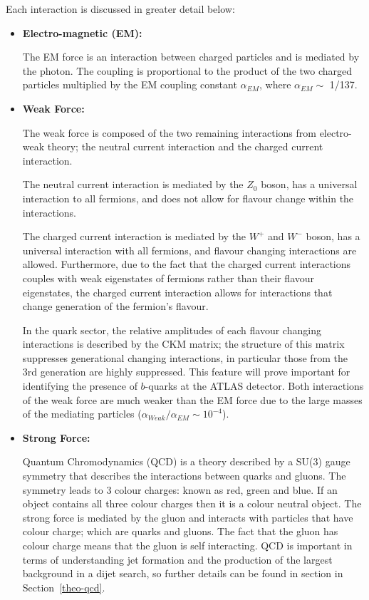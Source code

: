 \noindent
Each interaction is discussed in greater detail below:
\begin{itemize}[leftmargin=*]
\item\textbf{Electro-magnetic (EM):}

  The EM force is an interaction between charged particles and is mediated by the photon.
  The coupling is proportional to the product of the two charged particles
  multiplied by the EM coupling constant $\alpha_{EM}$, where $\alpha_{EM} \sim$ 1/137.\\ %

\item\textbf{Weak Force:}
  
  The weak force is composed of the two remaining interactions from electro-weak theory;
  the neutral current interaction and the charged current interaction.
  
  The neutral current interaction is mediated by the $Z_0$ boson, has a universal interaction to all fermions,
  and does not allow for flavour change within the interactions.

  The charged current interaction is mediated by the $W^+$ and $W^-$ boson, has a universal interaction with all fermions,
  and flavour changing interactions are allowed.
  Furthermore, due to the fact that the charged current interactions couples with weak eigenstates of fermions rather than
  their flavour eigenstates, the charged current interaction allows for interactions that change generation of the fermion's flavour.
  
  In the quark sector, the relative amplitudes of each flavour changing interactions is described by the CKM matrix;
  the structure of this matrix suppresses generational changing interactions,
  in particular those from the 3rd generation  are highly suppressed.
  This feature will prove important for identifying the presence of $b$-quarks at the ATLAS detector.
  Both interactions of the weak force are much weaker than the EM force due to the large masses of the mediating particles
  ($\alpha_{Weak}/\alpha_{EM} \sim 10^{-4}$).\\ %
  
\item\textbf{Strong Force:}

  Quantum Chromodynamics (QCD) is a theory described by a SU(3) gauge symmetry that describes the interactions between quarks and gluons.
  The symmetry leads to 3 colour charges: known as red, green and blue.
  If an object contains all three colour charges then it is a colour neutral object.
  The strong force is mediated by the gluon and interacts with particles that have colour charge; which are quarks and gluons.
  The fact that the gluon has colour charge means that the gluon is self interacting.
  QCD is important in terms of understanding jet formation and the production of the
  largest background in a dijet search, so further details can be found in section in Section~\ref{theo-qcd}.\\


\end{itemize}
